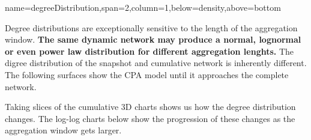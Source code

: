 \documentclass[a0paper,portrait]{baposter}
\begin{document}
\begin{poster}
{name=degreeDistribution,span=2,column=1,below=density,above=bottom}{
Degree distributions are exceptionally sensitive to the length of the aggregation window. \textbf{The same dynamic network may produce a normal, lognormal or even power law distribution for different aggregation lenghts.} The digree distribution of the snapshot and cumulative network is inherently different. The following surfaces show the CPA model until it approaches the complete network.
\vspace{-0.2em}
\begin{center}
\end{center}
\vspace{-0.2em}
Taking slices of the cumulative 3D charts shows us how the degree distribution changes. The log-log charts below show the progression of these changes as the aggregation window gets larger.
\vspace{-0.2em}
\begin{center}
\end{center}
}

\end{poster}
\end{document}
